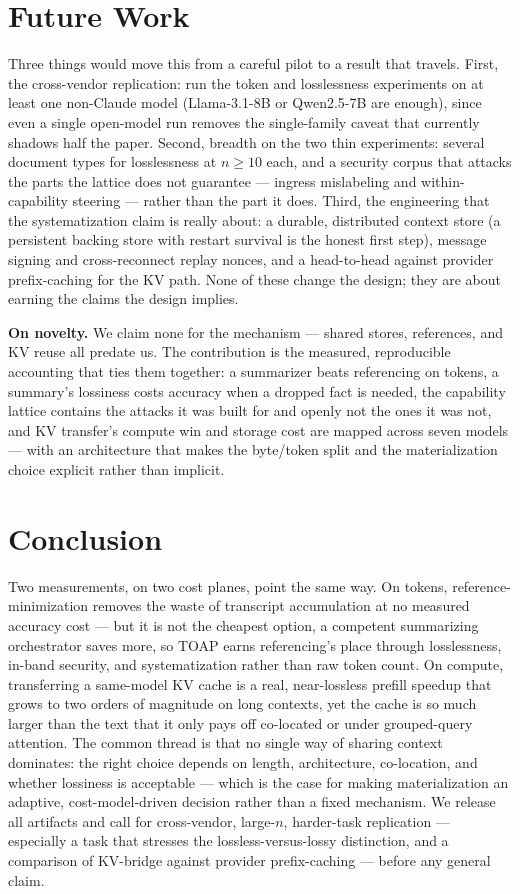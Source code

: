 \documentclass[11pt]{article}
\begin{document}
\section{Future Work}\label{sec:future}
Three things would move this from a careful pilot to a result that travels. First, the cross-vendor
replication: run the token and losslessness experiments on at least one non-Claude model
(Llama-3.1-8B or Qwen2.5-7B are enough), since even a single open-model run removes the
single-family caveat that currently shadows half the paper. Second, breadth on the two thin
experiments: several document types for losslessness at $n\!\ge\!10$ each, and a security corpus that
attacks the parts the lattice does not guarantee --- ingress mislabeling and within-capability steering
--- rather than the part it does. Third, the engineering that the systematization claim is really
about: a durable, distributed context store (a persistent backing store with restart survival is the
honest first step), message signing and cross-reconnect replay nonces, and a head-to-head against
provider prefix-caching for the KV path. None of these change the design; they are about earning the
claims the design implies.

\noindent\textbf{On novelty.} We claim none for the mechanism --- shared stores, references, and KV
reuse all predate us. The contribution is the measured, reproducible accounting that ties them
together: a summarizer beats referencing on tokens, a summary's lossiness costs accuracy when a dropped
fact is needed, the capability lattice contains the attacks it was built for and openly not the ones it
was not, and KV transfer's compute win and storage cost are mapped across seven models --- with an
architecture that makes the byte/token split and the materialization choice explicit rather than
implicit.

\section{Conclusion}
Two measurements, on two cost planes, point the same way. On tokens, reference-minimization removes the
waste of transcript accumulation at no measured accuracy cost --- but it is not the cheapest option, a
competent summarizing orchestrator saves more, so TOAP earns referencing's place through losslessness,
in-band security, and systematization rather than raw token count. On compute, transferring a same-model
KV cache is a real, near-lossless prefill speedup that grows to two orders of magnitude on long contexts,
yet the cache is so much larger than the text that it only pays off co-located or under grouped-query
attention. The common thread is that no single way of sharing context dominates: the right choice
depends on length, architecture, co-location, and whether lossiness is acceptable --- which is the case
for making materialization an adaptive, cost-model-driven decision rather than a fixed mechanism. We
release all artifacts and call for cross-vendor, large-$n$, harder-task replication --- especially a
task that stresses the lossless-versus-lossy distinction, and a comparison of KV-bridge against provider
prefix-caching --- before any general claim.
\end{document}

